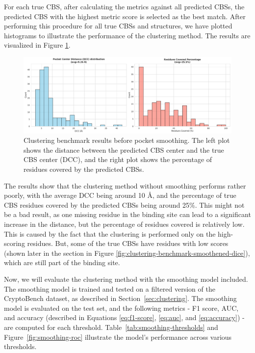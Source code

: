 For each true CBS, after calculating the metrics against all predicted CBSs, the predicted CBS with the highest metric score is selected as the best match. After performing this procedure for all true CBSs and structures, we have plotted histograms to illustrate the performance of the clustering method. The results are visualized in Figure \ref{fig:clustering-benchmark}.

\begin{figure}[htbp]
    \centering
    \includegraphics[width=\textwidth]{img/non-smoothened-1.pdf}
    \caption{Clustering benchmark results before pocket smoothing. The left plot shows the distance between the predicted CBS center and the true CBS center (DCC), and the right plot shows the percentage of residues covered by the predicted CBSs.}
    \label{fig:clustering-benchmark}
\end{figure}

The results show that the clustering method without smoothing performs rather poorly, with the average DCC being around 10 \AA, and the percentage of true CBS residues covered by the predicted CBSs being around 25\%. This might not be a bad result, as one missing residue in the binding site can lead to a significant increase in the distance, but the percentage of residues covered is relatively low. This is caused by the fact that the clustering is performed only on the high-scoring residues. But, some of the true CBSs have residues with low scores (shown later in the section in Figure \ref{fig:clustering-benchmark-smoothened-dice}), which are still part of the binding site.

Now, we will evaluate the clustering method with the smoothing model included. The smoothing model is trained and tested on a filtered version of the CryptoBench dataset, as described in Section~\ref{sec:clustering}. The smoothing model is evaluated on the test set, and the following metrics - F1 score, AUC, and accuracy (described in Equations \ref{eq:f1-score}, \ref{eq:auc}, and \ref{eq:accuracy}) - are computed for each threshold. Table~\ref{tab:smoothing-thresholds} and Figure~\ref{fig:smoothing-roc} illustrate the model's performance across various thresholds.

